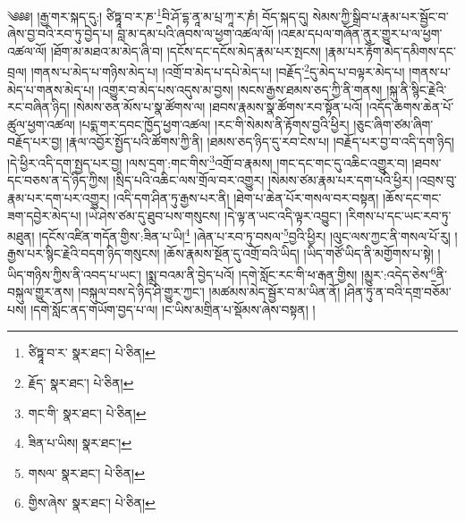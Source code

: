 \setcounter{footnote}{0} 
 ༄༅༅། །རྒྱ་གར་སྐད་དུ:། ཙིཏྟཱ་བ་ར་ཎ་\footnote{ཙིཏྟཱ་བ་ར་  སྣར་ཐང་།  པེ་ཅིན། }བི་ཤོ་དྷ་ནཱ་མ་པྲ་ཀཱ་ར་ཎཾ། བོད་སྐད་དུ། སེམས་ཀྱི་སྒྲིབ་པ་རྣམ་པར་སྦྱོང་བ་ཞེས་བྱ་བའི་རབ་ཏུ་བྱེད་པ། བླ་མ་དམ་པའི་ཞབས་ལ་ཕྱག་འཚལ་ལོ། །འཇམ་དཔལ་གཞོན་ནུར་གྱུར་པ་ལ་ཕྱག་འཚལ་ལོ། །ཐོག་མ་མཐའ་མ་མེད་ཞི་བ། །དངོས་དང་དངོས་མེད་རྣམ་པར་སྤངས། །རྣམ་པར་རྟོག་མེད་དམིགས་དང་བྲལ། །གནས་པ་མེད་པ་གཉིས་མེད་པ། །འགྲོ་བ་མེད་པ་དཔེ་མེད་པ། །བརྗོད་\footnote{རྗོད་  སྣར་ཐང་།  པེ་ཅིན། }དུ་མེད་པ་བལྟར་མེད་པ། །གནས་པ་མེད་པ་གནས་མེད་པ། །འགྱུར་བ་མེད་པས་འདུས་མ་བྱས། །སངས་རྒྱས་ཐམས་ཅད་ཀྱི་ནི་གནས། །སྐུ་ནི་སྙིང་རྗེའི་རང་བཞིན་ཉིད། །སེམས་ཅན་མོས་པ་སྣ་ཚོགས་ལ། །ཐབས་རྣམས་སྣ་ཚོགས་རབ་སྟོན་པའོ། །འདོད་ཆགས་ཆེན་པོ་ཚུལ་ཕྱག་འཚལ། །པདྨ་གར་དབང་ཁྱོད་ཕྱག་འཚལ། །རང་གི་སེམས་ནི་རྟོགས་བྱའི་ཕྱིར། །ཅུང་ཞིག་ཙམ་ཞིག་བརྗོད་པར་བྱ། །རྣལ་འབྱོར་སྤྱོད་པའི་ཚོགས་ཀྱི་ནི། །ཐམས་ཅད་ཉིད་དུ་རབ་ངེས་པ། །བརྗོད་པར་བྱ་བ་འདི་དག་ཉིད། །དེ་ཕྱིར་འདི་དག་སྤྱད་པར་བྱ། །ལས་དྲག་:གང་གིས་\footnote{གང་གི་  སྣར་ཐང་།  པེ་ཅིན། }འགྲོ་བ་རྣམས། །གང་དང་གང་དུ་འཆིང་འགྱུར་བ། །ཐབས་དང་བཅས་ན་དེ་ཉིད་ཀྱིས། །སྲིད་པའི་འཆིང་ལས་གྲོལ་བར་འགྱུར། །སེམས་ཙམ་རྣམ་པར་དག་པའི་ཕྱིར། །འབྲས་བུ་རྣམ་པར་དག་པར་འགྱུར། །འདི་དག་ཤིན་ཏུ་རྒྱས་པར་ནི། །ཐེག་པ་ཆེན་པོར་གསལ་བར་བསྟན། །ཆོས་དང་གང་ཟག་དབྱེར་མེད་པ། །ཡེ་ཤེས་ཙམ་དུ་ཐུབ་པས་གསུངས། །དེ་ལྟ་ན་ཡང་འདི་ལྟར་འབྱུང་། །རིགས་པ་དང་ཡང་རབ་ཏུ་མཐུན། །དངོས་འཛིན་གདོན་གྱིས་:ཟིན་པ་ཡི།\footnote{ཟིན་པ་ཡིས།  སྣར་ཐང་། } །ཞེན་པ་རབ་ཏུ་བསལ་\footnote{གསལ་  སྣར་ཐང་།  པེ་ཅིན། }བྱའི་ཕྱིར། །ལུང་ལས་ཀྱང་ནི་གསལ་པོ་རུ། །རྒྱས་པར་སྙིང་རྗེའི་བདག་ཉིད་གསུངས། །ཆོས་རྣམས་སྔོན་དུ་འགྲོ་བའི་ཡིད། །ཡིད་གཙོ་ཡིད་ནི་མགྱོགས་པ་སྟེ། །ཡིད་གཉིས་ཀྱིས་ནི་འབད་པ་ཡང་། །སྨྲ་བའམ་ནི་བྱེད་པའོ། །དགེ་སློང་རང་གི་ཕ་རྒན་གྱིས། །མྱུར་:འདེད་ཅེས་\footnote{གྱིས་ཞེས་  སྣར་ཐང་།  པེ་ཅིན། }ནི་བསྐུལ་གྱུར་ནས། །བསྐུལ་བས་དེ་ཉིད་ཤི་གྱུར་ཀྱང་། །མཚམས་མེད་སྦྱོར་བ་མ་ཡིན་ནོ། །ཤིན་ཏུ་ན་བའི་དགྲ་བཅོམ་པས། །དགེ་སློང་ནད་གཡོག་བྱད་པ་ལ། །ང་ཡིས་མགྲིན་པ་སྡོམས་ཞེས་བསྟན། །
